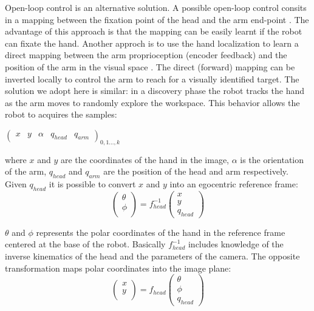 Open-loop control is an alternative solution. A possible open-loop control 
consits in a mapping between the fixation point of the head and the arm 
end-point \cite{metta00Babybot}. The advantage of this approach is that the mapping 
can be easily learnt if the robot can fixate the hand. Another approch is to
use the hand localization to learn a direct mapping between the arm 
proprioception (encoder feedback) and the position of the arm in the visual 
space \cite{natale05from}. The direct (forward) mapping can be inverted 
locally to control the arm to reach for a visually identified target. The 
solution we adopt here is similar: in a discovery phase the robot
tracks the hand as the arm moves to randomly explore the workspace.
This behavior allows the robot to acquires the samples:

\begin{center}
\begin{math}
  \left(\begin{array}{ccccc}
    x & y & \alpha &q_{head} &q_{arm} \end{array}\right)_{0,1\dots,k}
\end{math}
\end{center}

where $x$ and $y$ are the coordinates of the hand in the image,
$\alpha$ is the orientation of the arm, $q_{head}$ and $q_{arm}$ are 
the position of the head and arm respectively. Given $q_{head}$ it is
possible to convert $x$ and $y$ into an egocentric reference frame:
\begin{equation}
  \left(\begin{array}{c}
    \theta \\
    \phi \\
    \end{array}\right)
  = f_{head}^{-1}
  \left(\begin{array}{c}
    x \\
    y \\
    q_{head}
    \end{array} \right)
\label{eq-head-inverse}
\end{equation}

$\theta$ and $\phi$ represents the polar coordinates of the hand in the
reference frame centered at the base of the robot. Basically 
$f_{head}^{-1}$ includes knowledge of the inverse kinematics of the 
head and the parameters of the camera. The opposite transformation maps 
polar coordinates into the image plane:
\begin{equation}
  \left(\begin{array}{c}
    x \\
    y \\
    \end{array}\right)
  = f_{head}
  \left(\begin{array}{c}
    \theta \\
    \phi \\
    q_{head}
    \end{array} \right)
\label{eq-head-direct}
\end{equation}

